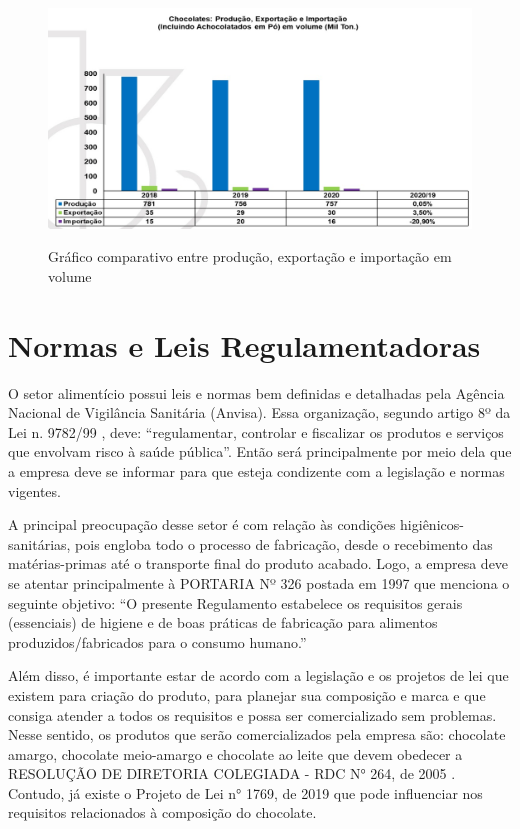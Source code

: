 \documentclass[
	12pt,				%
	openright,			%
	oneside,			%
	a4paper,			%
	english,			%
	french,				%
	spanish,			%
	brazil				%
	]{abntex2}
\begin{document}
\begin{figure}[H]
\begin{center}
\caption{Gráfico comparativo entre produção, exportação e importação em volume}
\includegraphics[scale=0.4]{../../Pictures/fig1.jpeg} 
\label{figmercado2}
\end{center}
\end{figure}

\newpage
\chapter{Normas e Leis Regulamentadoras}

O setor alimentício possui leis e normas bem definidas e detalhadas pela Agência Nacional de Vigilância Sanitária (Anvisa). Essa organização, segundo artigo 8º da Lei n. 9782/99 \cite{anvisa9782}, deve: “regulamentar, controlar e fiscalizar os produtos e serviços que envolvam risco à saúde pública”. Então será principalmente por meio dela que a empresa deve se informar para que esteja condizente com a legislação e normas vigentes. 

A principal preocupação desse setor é com relação às condições higiênicos-sanitárias, pois engloba todo o processo de fabricação, desde o recebimento das matérias-primas até o transporte final do produto acabado. Logo, a empresa deve se atentar principalmente à PORTARIA Nº 326 postada em 1997 \cite{anvisa326} que menciona o seguinte objetivo: “O presente Regulamento estabelece os requisitos gerais (essenciais) de higiene e de boas práticas de fabricação para alimentos produzidos/fabricados para o consumo humano.” 

Além disso, é importante estar de acordo com a legislação e os projetos de lei que existem para criação do produto, para planejar sua composição e marca e que consiga atender a todos os requisitos e possa ser comercializado sem problemas. Nesse sentido, os produtos que serão comercializados pela empresa são: chocolate amargo, chocolate meio-amargo e chocolate ao leite que devem obedecer a RESOLUÇÃO DE DIRETORIA COLEGIADA - RDC N° 264, de 2005 \cite{anvisa264}. Contudo, já existe o Projeto de Lei n° 1769, de 2019 \cite{anvisa1769} que pode influenciar nos requisitos relacionados à composição do chocolate.  
\end{document}
